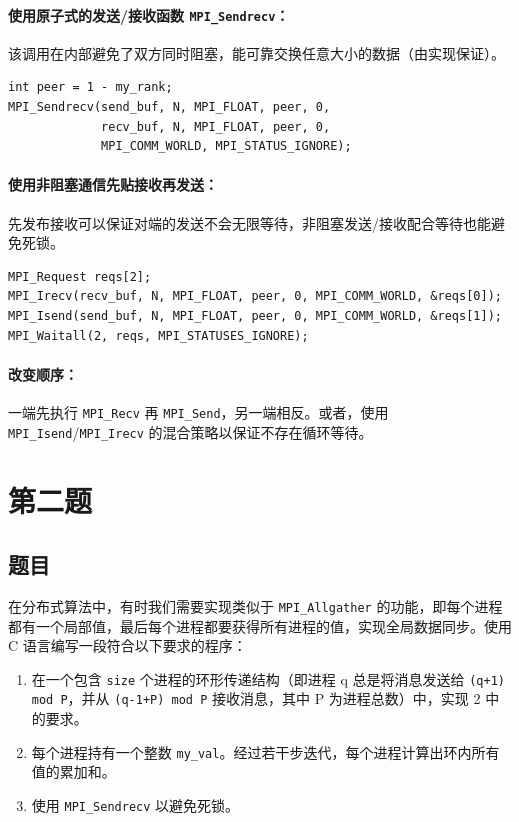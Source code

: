 \subsubsection{使用原子式的发送/接收函数 \texttt{MPI\_Sendrecv}：}

该调用在内部避免了双方同时阻塞，能可靠交换任意大小的数据（由实现保证）。

\begin{lstlisting}[style=cleancpp]
int peer = 1 - my_rank;
MPI_Sendrecv(send_buf, N, MPI_FLOAT, peer, 0, 
             recv_buf, N, MPI_FLOAT, peer, 0,
             MPI_COMM_WORLD, MPI_STATUS_IGNORE);
\end{lstlisting}

\subsubsection{使用非阻塞通信先贴接收再发送：}

先发布接收可以保证对端的发送不会无限等待，非阻塞发送/接收配合等待也能避免死锁。

\begin{lstlisting}[style=cleancpp]
MPI_Request reqs[2];
MPI_Irecv(recv_buf, N, MPI_FLOAT, peer, 0, MPI_COMM_WORLD, &reqs[0]);
MPI_Isend(send_buf, N, MPI_FLOAT, peer, 0, MPI_COMM_WORLD, &reqs[1]);
MPI_Waitall(2, reqs, MPI_STATUSES_IGNORE);
\end{lstlisting}
    
\subsubsection{改变顺序：}

一端先执行 \texttt{MPI\_Recv} 再 \texttt{MPI\_Send}，另一端相反。或者，使用 \texttt{MPI\_Isend}/\texttt{MPI\_Irecv} 的混合策略以保证不存在循环等待。

\chapter{第二题}

\section{题目}

在分布式算法中，有时我们需要实现类似于 \texttt{MPI\_Allgather} 的功能，即每个进程都有一个局部值，最后每个进程都要获得所有进程的值，实现全局数据同步。使用 C 语言编写一段符合以下要求的程序：
\begin{enumerate}
    \item 在一个包含 \texttt{size} 个进程的环形传递结构（即进程 q 总是将消息发送给 \texttt{(q+1) mod P}，并从 \texttt{(q-1+P) mod P} 接收消息，其中 P 为进程总数）中，实现 2 中的要求。
    \item 每个进程持有一个整数 \texttt{my\_val}。经过若干步迭代，每个进程计算出环内所有值的累加和。
    \item 使用 \texttt{MPI\_Sendrecv} 以避免死锁。
\end{enumerate}

